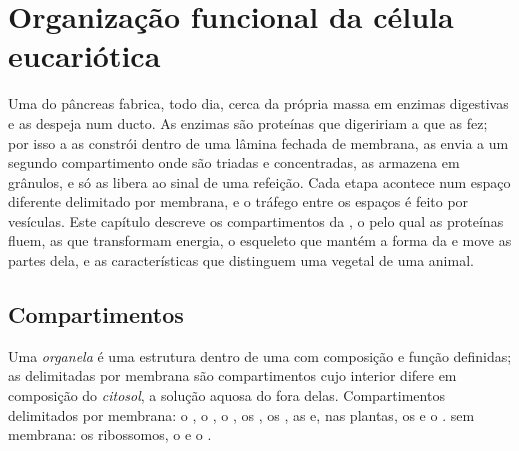 \chapter{Organização funcional da célula eucariótica}\label{ch:b1:eukaryotic-cell}

Uma  do pâncreas fabrica, todo dia, cerca da própria massa em
enzimas digestivas e as despeja num ducto. As enzimas são proteínas que
digeririam a  que as fez; por isso a  as constrói dentro de
uma lâmina fechada de membrana, as envia a um segundo compartimento onde
são triadas e concentradas, as armazena em grânulos, e só as libera ao
sinal de uma refeição. Cada etapa acontece num espaço diferente
delimitado por membrana, e o tráfego entre os espaços é feito por
vesículas. Este capítulo descreve os compartimentos da , o  pelo qual as proteínas fluem, as
 que transformam energia, o esqueleto que mantém a forma da
 e move as partes dela, e as características que distinguem uma
 vegetal de uma animal.

\section{Compartimentos}

\begin{definition}\label{def:b1:eukaryotic-cell:organelle}
Uma \emph{organela} é uma estrutura dentro de uma 
com composição e função definidas; as  delimitadas por membrana
são compartimentos cujo interior difere em composição do
\emph{citosol}, a solução aquosa do  fora
delas. Compartimentos delimitados por membrana: o , o , o , os , os , as
 e, nas plantas, os  e o .  sem
membrana: os ribossomos, o  e o .
\end{definition}

